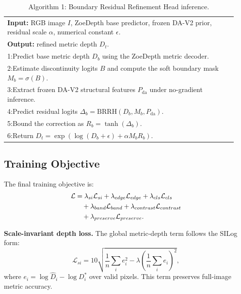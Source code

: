 \documentclass{ieeeaccess}
\begin{document}
\begin{table}[t]
\centering
\small
\caption{Algorithm 1: Boundary Residual Refinement Head inference.}
\label{alg:brrh-inference}
\begin{tabular}{p{0.94\linewidth}}
\toprule
\textbf{Input:} RGB image $I$, ZoeDepth base predictor, frozen DA-V2 prior, residual scale $\alpha$, numerical constant $\epsilon$. \\
\textbf{Output:} refined metric depth $D_t$. \\
\midrule
1:\quad Predict base metric depth $D_b$ using the ZoeDepth metric decoder. \\
2:\quad Estimate discontinuity logits $B$ and compute the soft boundary mask $M_b=\sigma(B)$. \\
3:\quad Extract frozen DA-V2 structural features $P_{\mathrm{da}}$ under no-gradient inference. \\
4:\quad Predict residual logits $\Delta_b=\mathrm{BRRH}(D_b,M_b,P_{\mathrm{da}})$. \\
5:\quad Bound the correction as $R_b=\tanh(\Delta_b)$. \\
6:\quad Return $D_t=\exp(\log(D_b+\epsilon)+\alpha M_b R_b)$. \\
\bottomrule
\end{tabular}
\end{table}

\subsection{Training Objective}

The final training objective is:
\begin{align}
\mathcal{L} &=
\lambda_{si}\mathcal{L}_{si}
+ \lambda_{edge}\mathcal{L}_{edge}
+ \lambda_{cls}\mathcal{L}_{cls} \notag\\
&\quad
+ \lambda_{band}\mathcal{L}_{band}
+ \lambda_{contrast}\mathcal{L}_{contrast} \notag\\
&\quad
+ \lambda_{preserve}\mathcal{L}_{preserve}.
\label{eq:total_loss}
\end{align}

\textbf{Scale-invariant depth loss.}
The global metric-depth term follows the SILog form:
\begin{equation}
\mathcal{L}_{si}
=10\sqrt{\frac{1}{n}\sum_i e_i^2
-\lambda\left(\frac{1}{n}\sum_i e_i\right)^2},
\end{equation}
where $e_i=\log \hat{D}_i-\log D_i^*$ over valid pixels. This term preserves full-image metric accuracy.
\end{document}
